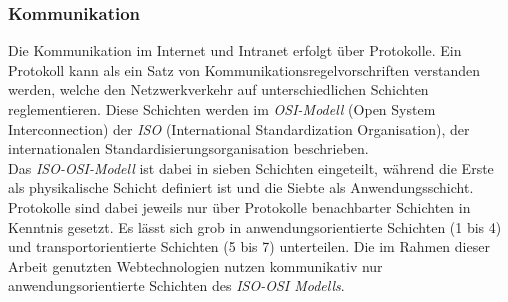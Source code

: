 \subsubsection{Kommunikation}\label{sec:kommunikation}
Die Kommunikation im Internet und Intranet erfolgt über Protokolle. 
Ein Protokoll kann als ein Satz von Kommunikationsregelvorschriften \cite{Safran2011} verstanden werden, welche den Netzwerkverkehr auf unterschiedlichen Schichten reglementieren. 
Diese Schichten werden im \emph{OSI-Modell} (Open System Interconnection) der \emph{ISO} (International Standardization Organisation), der internationalen Standardisierungsorganisation beschrieben. 
\\ 
Das \emph{ISO-OSI-Modell} ist dabei in sieben Schichten eingeteilt, während die Erste als physikalische Schicht definiert ist und die Siebte als Anwendungsschicht. Protokolle sind dabei jeweils nur über Protokolle benachbarter Schichten in Kenntnis gesetzt. Es lässt sich grob in anwendungsorientierte Schichten (1 bis 4) und transportorientierte Schichten (5 bis 7) unterteilen. Die im Rahmen dieser Arbeit genutzten Webtechnologien nutzen kommunikativ nur anwendungsorientierte Schichten des \emph{ISO-OSI Modells}.



